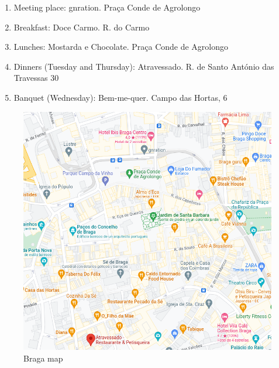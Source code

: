 \documentclass[11pt]{article}
\begin{document}
\begin{enumerate}
    \item Meeting place: 
gnration.
Praça Conde de Agrolongo 

\item Breakfast:
Doce Carmo.
R. do Carmo

\item Lunches:
Mostarda e Chocolate.
Praça Conde de Agrolongo

\item Dinners (Tuesday and Thursday):
Atravessado.
R. de Santo António das Travessas 30

\item Banquet (Wednesday):
Bem-me-quer.
Campo das Hortas, 6
\end{enumerate}

\begin{figure}[ht]
    \centering
    \includegraphics[scale=0.5, keepaspectratio]{braga_map.png}
    \caption{Braga map}
    \label{figure:map}
 \end{figure}
\end{document}
